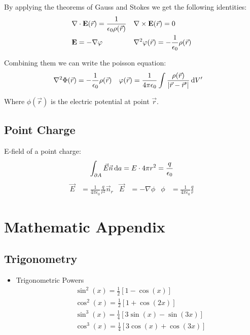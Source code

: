 \documentclass[a4paper, fontsize=8pt, landscape, DIV=1]{scrartcl}
\begin{document}
\begin{multicols*}{4}
  By applying the theorems of Gauss and Stokes we get the following identities:
  \begin{align*}
    &\nabla \cdot \mathbf{E}(\vec{r}) = \frac{1}{\epsilon_0\rho(\vec{r})} & &\nabla\times\mathbf{E}(\vec{r}) = 0 \\
    &\mathbf{E} = -\nabla\varphi & &\nabla^2\varphi(\vec{r}) = -\frac{1}{\epsilon_0}\rho(\vec{r})
  \end{align*}

  Combining them we can write the poisson equation:
  \begin{align*}
    \nabla^2\Phi(\vec{r}) &= -\frac{1}{\epsilon_0}\rho(\vec{r}) &
    \varphi(\vec{r}) &= \frac{1}{4\pi\epsilon_0}\int\frac{\rho(\vec{r})}{|\vec{r}-\vec{r}'|}\,\mathrm{d} V'
  \end{align*}

  Where $\phi(\vec{r})$ is the electric potential at point $\vec{r}$.

  \subsection{Point Charge}
  E-field of a point charge:
    \[\int_{\partial A} \vec{E}\vec{n} \,\mathrm{d} a = E\cdot4\pi r^2 = \frac{q}{\epsilon_0} \]
  \begin{align*}
    \vec{E} &= \frac{1}{4\pi\epsilon_0}\frac{q}{r^2}\vec{n}_r & \vec{E}&=-\nabla\phi & \phi&=\frac{1}{4\pi\epsilon_0}\frac{q}{r}
  \end{align*}


  \vfill\null
  \pagebreak
  \section{Mathematic Appendix}
  \subsection{Trigonometry}
  \begin{itemize}
    \item Trigonometric Powers
    {\small\begin{align*}
      & \sin^2(x) = \frac{1}{2}[1-\cos(x)] \\
      & \cos^2(x) = \frac{1}{2}[1+\cos(2x)] \\
      & \sin^3(x) = \frac{1}{4}[3\sin(x)-\sin(3x)] \\
      & \cos^3(x) = \frac{1}{4}[3\cos(x) + \cos(3x)]
    \end{align*}}%


\end{itemize}
\end{multicols*}
\end{document}
